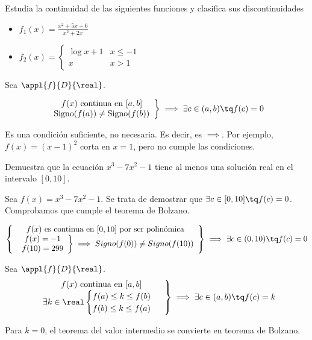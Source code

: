 \begin{problem}Estudia la continuidad de las siguientes funciones y clasifica sus discontinuidades

\begin{itemize}
	\item $f_1(x) = \displaystyle\frac{x^2+5x+6}{x^2+2x}$
	\item $f_2(x) = \begin{cases}\log{x+1} & x\leq -1\\x & x>1\end{cases}$
\end{itemize}
\solution
\end{problem}



\begin{theorem}
Sea $\appl{f}{D}{\real}$.

\[
\left.\begin{array}{c}f(x) \text{ continua en } [a,b]\\\text{Signo}(f(a))\neq \text{Signo}(f(b))\end{array}\right\}\implies \exists c\in(a,b) \tq f(c) = 0
\]

\end{theorem}
\obs Es una condición suficiente, no necesaria. Es decir, es $\implies $. Por ejemplo, $f(x) = (x-1)^2$ corta en $x=1$, pero no cumple las condiciones.

\begin{problem} Demuestra que la ecuación $x^3-7x^2-1$ tiene al menos una solución real en el intervalo $[0,10]$.
\solution

Sea $f(x) = x^3-7x^2-1$. Se trata de demostrar que $\exists c\in[0,10]\tq f(c) = 0$. Comprobamos que cumple el teorema de Bolzano.

\[
\left\{
	\begin{array}{c}
		f(x) \text{ es continua en } [0,10] \text{ por ser polinómica}\\
		\left.\begin{array}{c}
		f(x) = -1 \\
		f(10) = 299\end{array}
		\right\}\implies Signo(f(0))\neq Signo(f(10))
	\end{array}
\right\}\implies \exists c\in(0,10)\tq f(c)=0 
\]
\end{problem}

\begin{theorem}
Sea $\appl{f}{D}{\real}$.
\[
\left.\begin{array}{c}f(x) \text{ continua en } [a,b]\\
\exists k\in\real \begin{cases}f(a)\leq k\leq f(b)\\f(b)\leq k \leq f(a)\end{cases}\end{array}\right\}\implies \exists c\in(a,b) \tq f(c) = k
\]
\end{theorem}

\obs Para $k=0$, el teorema del valor intermedio se convierte en teorema de Bolzano.

